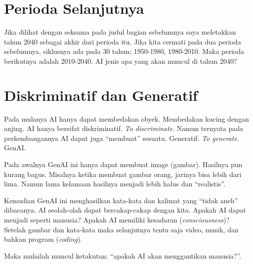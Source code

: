 \section{Perioda Selanjutnya}
Jika dilihat dengan seksama pada judul bagian sebelumnya saya meletakkan
tahun 2040 sebagai akhir dari perioda itu.
Jika kita cermati pada dua perioda sebelumnya, siklusnya ada pada 30 tahun;
1950-1980, 1980-2010. Maka perioda berikutnya adalah 2010-2040.
AI jenis apa yang akan muncul di tahun 2040?


\section{Diskriminatif dan Generatif}
Pada mulanya AI hanya dapat membedakan obyek. Membedakan kucing dengan anjing.
AI hanya bersifat diskriminatif. \emph{To discriminate}.
Namun ternyata pada perkembangannya AI dapat juga ``membuat'' sesuatu.
Generatif. \emph{To generate}. GenAI.

Pada awalnya GenAI ini hanya dapat membuat image (gambar).
Hasilnya pun kurang bagus. Misalnya ketika membuat gambar orang,
jarinya bisa lebih dari lima.
Namun lama kelamaan hasilnya menjadi lebih halus dan ``realistis''.

Kemudian GenAI ini menghasilkan kata-kata dan kalimat yang ``tidak aneh''
dibacanya. AI seolah-olah dapat bercakap-cakap dengan kita.
Apakah AI dapat menjadi seperti manusia?
Apakah AI memiliki kesadaran (\emph{consciousness})?
Setelah gambar dan kata-kata maka selanjutnya tentu saja video, musik,
dan bahkan program (\emph{coding}).

Maka mulailah muncul ketakutan; ``apakah AI akan menggantikan manusia?''.
